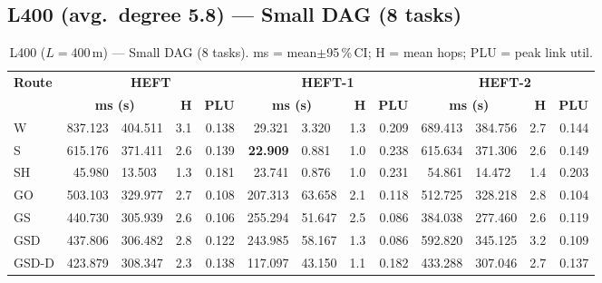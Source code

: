 \documentclass[11pt]{article}
\newcommand{\win}[1]{\textcolor{green!50!black}{\textbf{#1}}}
\newcommand{\bad}[1]{\textcolor{red!70!black}{#1}}
\begin{document}
\subsection{L400 (avg.\ degree 5.8) --- Small DAG (8 tasks)}
\begin{table}[H]\centering\small
\begin{tabular}{l r@{$\pm$}l r r r@{$\pm$}l r r r@{$\pm$}l r r}
\toprule
\textbf{Route} & \multicolumn{4}{c}{\textbf{HEFT}} & \multicolumn{4}{c}{\textbf{HEFT-1}} & \multicolumn{4}{c}{\textbf{HEFT-2}} \\
\cmidrule(lr){2-5}\cmidrule(lr){6-9}\cmidrule(lr){10-13}
& \multicolumn{2}{c}{\textbf{ms (s)}} & \textbf{H} & \textbf{PLU}& \multicolumn{2}{c}{\textbf{ms (s)}} & \textbf{H} & \textbf{PLU}& \multicolumn{2}{c}{\textbf{ms (s)}} & \textbf{H} & \textbf{PLU} \\
\midrule
  W & \bad{837.123} & 404.511 & 3.1 & 0.138 & 29.321 & 3.320 & 1.3 & 0.209 & \bad{689.413} & 384.756 & 2.7 & 0.144 \\
  S & 615.176 & 371.411 & 2.6 & 0.139 & \win{22.909} & 0.881 & 1.0 & 0.238 & 615.634 & 371.306 & 2.6 & 0.149 \\
  SH & 45.980 & 13.503 & 1.3 & 0.181 & 23.741 & 0.876 & 1.0 & 0.231 & 54.861 & 14.472 & 1.4 & 0.203 \\
  GO & 503.103 & 329.977 & 2.7 & 0.108 & 207.313 & 63.658 & 2.1 & 0.118 & 512.725 & 328.218 & 2.8 & 0.104 \\
  GS & 440.730 & 305.939 & 2.6 & 0.106 & \bad{255.294} & 51.647 & 2.5 & 0.086 & 384.038 & 277.460 & 2.6 & 0.119 \\
  GSD & 437.806 & 306.482 & 2.8 & 0.122 & 243.985 & 58.167 & 1.3 & 0.086 & 592.820 & 345.125 & 3.2 & 0.109 \\
  GSD-D & 423.879 & 308.347 & 2.3 & 0.138 & 117.097 & 43.150 & 1.1 & 0.182 & 433.288 & 307.046 & 2.7 & 0.137 \\
\bottomrule\end{tabular}
\caption{L400 ($L=400$\,m) --- Small DAG (8 tasks). ms = mean$\pm$95\,\%\,CI; H = mean hops; PLU = peak link util.}
\end{table}
\end{document}
